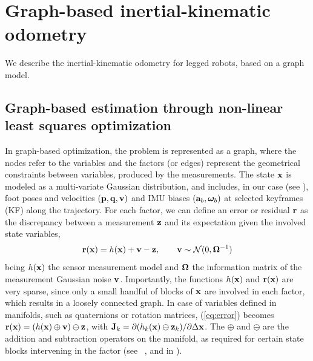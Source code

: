 
\section{Graph-based inertial-kinematic odometry}

We describe the inertial-kinematic odometry for legged robots, based on a graph model. 

\subsection{Graph-based estimation through non-linear least squares optimization}


In graph-based optimization, the problem is represented as a graph, where the nodes refer to the variables and the factors (or edges) represent the geometrical constraints between variables, produced by the measurements.
%
The state ${\bf x}$ is modeled as a multi-variate Gaussian distribution, and includes, in our case (see ), foot poses and velocities $({\bf p},{\bf q},{\bf v})$ and IMU biases $({\bf a}_b,{{\bm \omega}}_b)$ at selected keyframes (KF) along the trajectory.
%
For each factor, we can define an error or residual ${\bf r}$ as the discrepancy between a measurement ${\bf z}$ and its expectation given the involved state variables,
%
\begin{equation}
    {\bf r}({\bf x}) = h({\bf x}) + {\bf v} - {\bf z}, \qquad {\bf v} \sim \mathcal {\mathcal{N}} (0, {\bm \Omega}^{-1})\label{eq:error}
\end{equation}
%
being $h({\bf x})$ the sensor measurement model and ${\bm \Omega}$ the information matrix of the measurement Gaussian noise ${\bf v}$.
Importantly, the functions $h({\bf x})$ and ${\bf r}({\bf x})$ are very sparse, since only a small handful of blocks of ${\bf x}$ are involved in each factor, which results in a loosely connected graph.
In case of variables defined in manifolds, such as quaternions or rotation matrices, (\ref{eq:error}) becomes ${\bf r}({\bf x}) = (h({\bf x}) \oplus {\bf v}) \ominus {\bf z}$, with ${\bf J}_k = \partial (h_k({\bf x})\ominus{\bf z}_k)/\partial \Delta {\bf x}$. 
The $\oplus$ and $\ominus$ are the addition and subtraction operators on the manifold, as required for certain state blocks intervening in the factor (see \eg~\cite{Smith_arv90}, and  in ).

